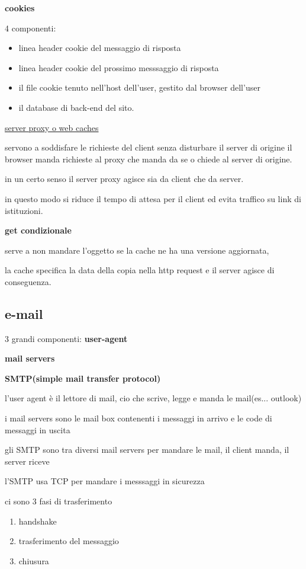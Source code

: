 \documentclass[12pt]{article}
\begin{document}
\textbf{cookies}

4 componenti:
\begin{itemize}
\item linea header cookie del messaggio di risposta
\item linea header cookie del prossimo messsaggio di risposta
\item il file cookie tenuto nell'host dell'user, gestito dal browser dell'user
\item il database di back-end del sito.
\end{itemize}


\underline{server proxy o web caches}

servono a soddisfare le richieste del client senza disturbare il server di origine il browser manda richieste al proxy che manda da se o chiede al server di origine.

in un certo senso il server proxy agisce sia da client che da server.

in questo modo si riduce il tempo di attesa per il client ed evita traffico su link di istituzioni.


\textbf{get condizionale}

serve a non mandare l'oggetto se la cache ne ha una versione aggiornata,

la cache specifica la data della copia nella http request e il server agisce di conseguenza.

\subsection{e-mail}

3 grandi componenti:
\textbf{user-agent}

\textbf{mail servers}

\textbf{SMTP(simple mail transfer protocol)}

l'user agent è il lettore di mail, cio che scrive, legge e manda le mail(es... outlook)

i mail servers sono le mail box contenenti i messaggi in arrivo e le code di messaggi in uscita

gli SMTP sono tra diversi mail servers per mandare le mail, il client manda, il server riceve


l'SMTP usa TCP per mandare i messsaggi in sicurezza


ci sono 3 fasi di trasferimento

\begin{enumerate}
\item handshake
\item trasferimento del messaggio
\item chiusura
\end{enumerate}
\end{document}
